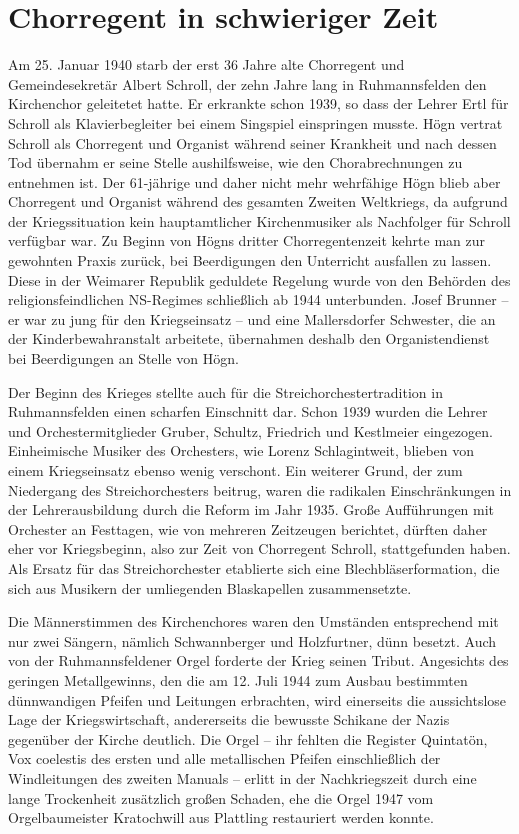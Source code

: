 \documentclass{book}
\begin{document}
\section{Chorregent in schwieriger Zeit}

Am 25. Januar 1940 starb der erst 36 Jahre alte Chorregent und
Gemeindese\-kretär Albert Schroll, der zehn Jahre lang in
Ruhmannsfelden den Kirchen\-chor geleitetet hatte. Er erkrankte schon
1939, so dass der Lehrer Ertl für Schroll als Klavierbegleiter bei
einem Singspiel einspringen musste. Högn ver\-trat Schroll als
Chorregent und Organist während seiner Krankheit und nach dessen Tod
übernahm er seine Stelle aushilfsweise, wie den Chorabrechnun\-gen zu
entnehmen ist. Der 61-jährige und daher nicht mehr wehrfähige Högn
blieb aber Chorregent und Organist während des gesamten Zweiten
Welt\-kriegs, da aufgrund der Kriegssituation kein hauptamtlicher
Kirchenmusiker als Nachfolger für Schroll verfügbar war. Zu Beginn von
Högns dritter Chor\-regentenzeit kehrte man zur gewohnten Praxis
zurück, bei Beerdigungen den Unterricht ausfallen zu lassen. Diese in
der Weimarer Republik geduldete Re\-gelung wurde von den Behörden des
religionsfeindlichen NS-Regimes schließ\-lich ab 1944 unterbunden.
Josef Brunner – er war zu jung für den Kriegsein\-satz – und eine
Mallersdorfer Schwester, die an der Kinderbewahranstalt ar\-beitete,
übernahmen deshalb den Organistendienst bei Beerdigungen an Stelle von
Högn.

Der Beginn des Krieges stellte auch für die Streichorchestertradition in
Ruhmannsfelden einen scharfen Einschnitt dar. Schon 1939 wurden die
Leh\-rer und Orchestermitglieder Gruber, Schultz, Friedrich und
Kestlmeier einge\-zogen. Einheimische Musiker des Orchesters, wie
Lorenz Schlagintweit, blie\-ben von einem Kriegseinsatz ebenso wenig
verschont. Ein weiterer Grund, der zum Niedergang des Streichorchesters
beitrug, waren die radikalen Ein\-schränkungen in der Lehrerausbildung
durch die Reform im Jahr 1935. Große Aufführungen mit Orchester an
Festtagen, wie von mehreren Zeitzeugen be\-richtet, dürften daher eher
vor Kriegsbeginn, also zur Zeit von Chorregent Schroll, stattgefunden
haben. Als Ersatz für das Streichorchester etablierte sich eine
Blechbläserformation, die sich aus Musikern der umliegenden
Blas\-kapellen zusammensetzte. 

Die Männerstimmen des Kirchenchores waren den Umständen entspre\-chend
mit nur zwei Sängern, nämlich Schwannberger und Holzfurtner, dünn
besetzt. Auch von der Ruhmannsfeldener Orgel forderte der Krieg seinen
Tribut. Angesichts des geringen Metallgewinns, den die am 12. Juli 1944
zum Ausbau bestimmten dünnwandigen Pfeifen und Leitungen erbrachten,
wird einerseits die aussichtslose Lage der Kriegswirtschaft,
andererseits die bewuss\-te Schikane der Nazis gegenüber der Kirche
deutlich. Die Orgel – ihr fehlten die Register Quintatön, Vox coelestis
des ersten und alle metallischen Pfeifen einschließlich der
Windleitungen des zweiten Manuals – erlitt in der Nach\-kriegszeit
durch eine lange Trockenheit zusätzlich großen Schaden, ehe die Orgel
1947 vom Orgelbaumeister Kratochwill aus Plattling restauriert werden
konnte.
\end{document}
